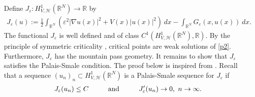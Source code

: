 \documentclass[a4paper]{amsart}
\begin{document}
\bigbreak

Define $J_{\varepsilon} : H^1_{V,\mathcal{H}}({\mathbb{R}}^N) \rightarrow {\mathbb{R}}$ by
\begin{align*}
  J_{\varepsilon}(u) := \frac{1}{2} \int_{{\mathbb{R}}^N} \left( \varepsilon^2
{\left| {\nabla u(x)} \right|}^2 + V(x){\left| {u(x)} \right|}^2 \right)\: dx - \int_{{\mathbb{R}}^N} G_{\varepsilon}(x,u(x))\: dx.
\end{align*}
The functional $J_{\varepsilon}$ is well defined and of class $C^1(H^1_{V,\mathcal{H}}({\mathbb{R}}^N),{\mathbb{R}})$.
By the principle of symmetric criticality \cite{Palais}, critical points are weak solutions of \eqref{p2}. Furthermore,
$J_{\varepsilon}$ has the mountain pass
geometry. It remains to show that $J_{\varepsilon}$ satisfies the Palais-Smale condition. The proof below is inspired from
\cite{BVS}. Recall that a sequence $(u_n)_n \subset H^1_{V,\mathcal{H}}({\mathbb{R}}^N)$ is a Palais-Smale sequence for
$J_{\varepsilon}$ if
\begin{align*}
 J_{\varepsilon}(u_n) \leq C \hspace{1cm} \textnormal{and}\hspace{1cm} J'_{\varepsilon}(u_n) \rightarrow 0,\ n \rightarrow
\infty.
\end{align*}
\end{document}
